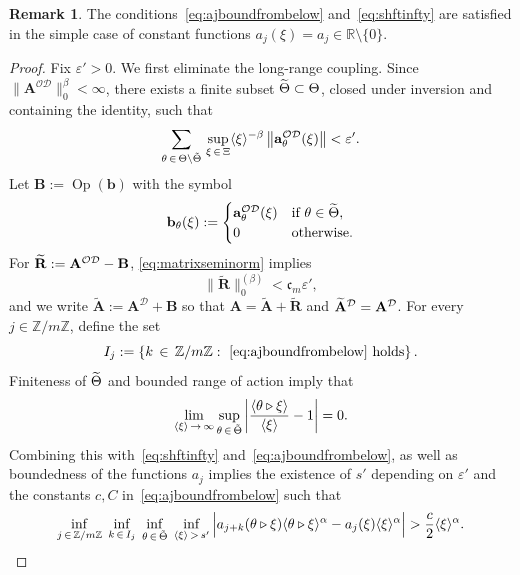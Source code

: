 \documentclass[10pt]{amsart}
\theoremstyle{definition}\newtheorem{defi}[theo]{Definition}\newtheorem{rema}[theo]{Remark}\newtheorem{exam}[theo]{Example}\newtheorem{nota}[theo]{Notation}
\DeclareMathOperator{\Op}{Op}
\newcommand{\R}{\mathbb R}
\newcommand{\Z}{\mathbb Z}
\newcommand{\CD}{\mathcal{D}}
\newcommand{\CO}{\mathcal{O}}
\newcommand{\COD}{{\CO\CD}}
\newcommand{\ba}{\mathbf a}
\newcommand{\BA}{\mathbf A}
\newcommand{\BB}{\mathbf B}
\newcommand{\BR}{\mathbf R}
\newcommand{\bbb}{\mathbf b}
\newcommand{\Fc}{\mathfrak c}
\newcommand{\eps}{\varepsilon}
\renewcommand{\epsilon}{\varepsilon}
\newcommand{\act}{\triangleright}
\renewcommand{\subseteq}{\subset}
\newcommand{\abs}[1]{\left\lvert #1 \right\rvert}
\newcommand{\set}[1]{\left\{ #1 \right\}}
\newcommand{\norm}[1]{\left\| #1 \right\|}
\newcommand{\ang}[1]{\langle #1 \rangle}
\let\oldtilde\tilde
\renewcommand*{\tilde}[1]{\mathchoice{\widetilde{#1}}{\widetilde{#1}}{\oldtilde{#1}}{\oldtilde{#1}}}
\begin{document}
\begin{rema}
The conditions~\eqref{eq:ajboundfrombelow} and~\eqref{eq:shftinfty} are satisfied in the simple case of constant functions $a_j(\xi)=a_j\in\R\setminus
\{0\}$.
\end{rema}
\begin{proof}
Fix $\epsilon' > 0$. We first eliminate the long-range coupling. Since $\|\BA^{\COD}\|^{\beta}_{0} < \infty$, there exists a finite subset $\tilde{\Theta} \subseteq \Theta$, closed under inversion and containing the identity, such that
\begin{equation}\label{eq:smallnorm}
\sum_{\theta\,\in\,\Theta \setminus \tilde \Theta}\,
\sup_{\xi\,\in\,\Xi} \ang \xi^{-\beta}\norm{\ba_\theta^{\COD}(\xi)} < \epsilon'.
\end{equation}
Let $\BB:= \Op(\bbb)$ with the symbol
\begin{equation}\label{eq:btilde}
\bbb_\theta(\xi) :=
\begin{cases}
\ba_\theta^{\COD}(\xi) & \text{if } \theta \in \tilde \Theta, \\
0 & \text{otherwise.}
\end{cases}
\end{equation}
For $\tilde \BR: = \BA^{\COD} - \BB$, \eqref{eq:matrixseminorm} implies
\begin{equation}\label{eq:estRtilde}
\big\|\widetilde{\BR}\big\|_{0}^{(\beta)} < \Fc_m\epsilon',
\end{equation}
and we write $\widetilde{\BA}:= \BA^\CD + \BB$ so that $\BA=\widetilde{\BA}+\widetilde{\BR}$ and $\tilde \BA^\CD = \BA^\CD$. For every $j \in \Z/m\Z$, define the set
\begin{equation}\label{eq:specificconstants}
I_j := \set{k\,\in\,\Z/m\Z :~\eqref{eq:ajboundfrombelow} \text{ holds}}.
\end{equation}
Finiteness of $\tilde \Theta$ and bounded range of action imply that
\begin{equation}
\lim_{\ang \xi\,\to\,\infty} \sup_{\theta\,\in\,\tilde \Theta} \abs{\frac{\ang{\theta
\act \xi}}{\ang \xi} -1} = 0.
\end{equation}
Combining this with~\eqref{eq:shftinfty} and~\eqref{eq:ajboundfrombelow}, as well as boundedness of the functions $a_j$ implies the existence of $s'$ depending on $\eps'$ and the constants $c, C$ in~\eqref{eq:ajboundfrombelow} such that
\begin{equation}
\inf_{j\,\in\,\Z / m \Z} \; \inf_{k\,\in\,I_j} \; \inf_{\theta\,\in
\,\tilde \Theta} \;
\inf_{\ang \xi\,>\,s'} \Big|a_{j+k}(\theta \act \xi) \ang{\theta \act \xi}^\alpha - a_j(\xi) \ang \xi^\alpha\Big| > \frac c 2 \ang \xi^\alpha.

\end{equation}
\end{proof}
\end{document}
